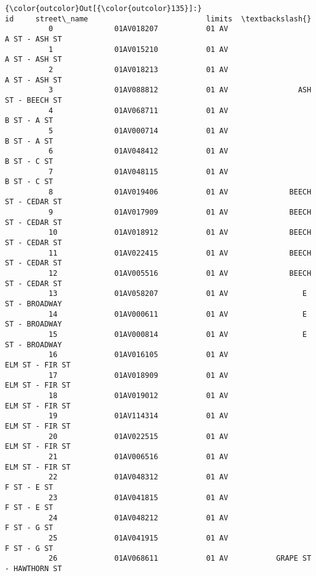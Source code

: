 \documentclass[11pt]{article}
\begin{document}
\begin{Verbatim}[commandchars=\\\{\}]
{\color{outcolor}Out[{\color{outcolor}135}]:}                        id     street\_name                           limits  \textbackslash{}
          0              01AV018207           01 AV                    A ST - ASH ST   
          1              01AV015210           01 AV                    A ST - ASH ST   
          2              01AV018213           01 AV                    A ST - ASH ST   
          3              01AV088812           01 AV                ASH ST - BEECH ST   
          4              01AV068711           01 AV                      B ST - A ST   
          5              01AV000714           01 AV                      B ST - A ST   
          6              01AV048412           01 AV                      B ST - C ST   
          7              01AV048115           01 AV                      B ST - C ST   
          8              01AV019406           01 AV              BEECH ST - CEDAR ST   
          9              01AV017909           01 AV              BEECH ST - CEDAR ST   
          10             01AV018912           01 AV              BEECH ST - CEDAR ST   
          11             01AV022415           01 AV              BEECH ST - CEDAR ST   
          12             01AV005516           01 AV              BEECH ST - CEDAR ST   
          13             01AV058207           01 AV                 E ST - BROADWAY    
          14             01AV000611           01 AV                 E ST - BROADWAY    
          15             01AV000814           01 AV                 E ST - BROADWAY    
          16             01AV016105           01 AV                  ELM ST - FIR ST   
          17             01AV018909           01 AV                  ELM ST - FIR ST   
          18             01AV019012           01 AV                  ELM ST - FIR ST   
          19             01AV114314           01 AV                  ELM ST - FIR ST   
          20             01AV022515           01 AV                  ELM ST - FIR ST   
          21             01AV006516           01 AV                  ELM ST - FIR ST   
          22             01AV048312           01 AV                      F ST - E ST   
          23             01AV041815           01 AV                      F ST - E ST   
          24             01AV048212           01 AV                      F ST - G ST   
          25             01AV041915           01 AV                      F ST - G ST   
          26             01AV068611           01 AV           GRAPE ST - HAWTHORN ST   

\end{Verbatim}
\end{document}
